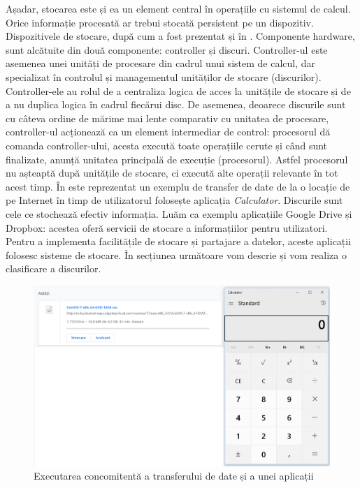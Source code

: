 Așadar, stocarea este și ea un element central în operațiile cu sistemul de
calcul. Orice informație procesată ar trebui stocată persistent pe un
dispozitiv. Dispozitivele de stocare, după cum a fost prezentat și în
. Componente hardware, sunt alcătuite
din două componente: controller și discuri. Controller-ul este asemenea unei
unități de procesare din cadrul unui sistem de calcul, dar specializat în
controlul și managementul unităților de stocare (discurilor). Controller-ele au
rolul de a centraliza logica de acces la unitățile de stocare și de a nu duplica
logica în cadrul fiecărui disc. De asemenea, deoarece discurile sunt cu câteva
ordine de mărime mai lente comparativ cu unitatea de procesare, controller-ul
acționează ca un element intermediar de control: procesorul dă comanda
controller-ului, acesta execută toate operațiile cerute și când sunt finalizate,
anunță unitatea principală de execuție (procesorul). Astfel procesorul nu
așteaptă după unitățile de stocare, ci execută alte operații relevante în tot
acest timp. În  este reprezentat un
exemplu de transfer de date de la o locație de pe Internet în timp de
utilizatorul folosește aplicația \textit{Calculator}. Discurile sunt cele ce
stochează efectiv informația. Luăm ca exemplu aplicațiile Google Drive și
Dropbox: acestea oferă servicii de stocare a informațiilor pentru utilizatori.
Pentru a implementa facilitățile de stocare și partajare a datelor, aceste
aplicații folosesc sisteme de stocare. În secțiunea următoare vom descrie și vom
realiza o clasificare a discurilor.

\begin{figure}[!htbp]
	\centering
	\includegraphics[width=15cm]{chapters/10-storage/img/concurent-img.png}
	\caption{Executarea concomitentă a transferului de date și a unei aplicații}
	\label{fig:storage-concurent}
\end{figure}

